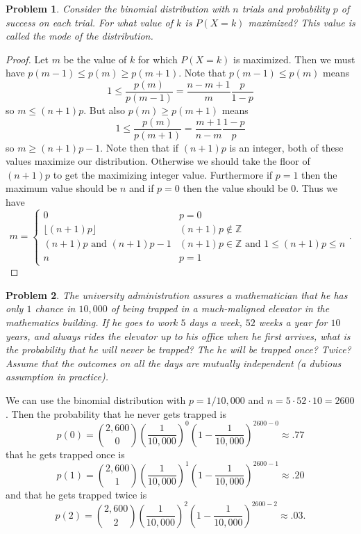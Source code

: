 \documentclass{article}
\newtheorem{problem}{Problem}
\begin{document}
\begin{problem}
\label{binom}
Consider the binomial distribution with $n$ trials and probability $p$ of success on each trial. For what value of $k$ is $P(X = k)$ maximized? This value is called the mode of the distribution.
\end{problem}
\begin{proof}
Let $m$ be the value of $k$ for which $P(X = k)$ is maximized. Then we must have $p(m-1) \leq p(m) \geq p(m+1)$. Note that $p(m-1) \leq p(m)$ means
\[
1 \leq \frac{p(m)}{p(m-1)} = \frac{n-m+1}{m} \frac{p}{1-p}
\]
so $m \leq (n+1)p$. But also $p(m) \geq p(m+1)$ means
\[
1 \leq \frac{p(m)}{p(m+1)} = \frac{m+1}{n-m} \frac{1-p}{p}
\]
so $m \geq (n+1)p - 1$. Note then that if $(n+1)p$ is an integer, both of these values maximize our distribution. Otherwise we should take the floor of $(n+1)p$ to get the maximizing integer value. Furthermore if $p = 1$ then the maximum value should be $n$ and if $p = 0$ then the value should be $0$. Thus we have
\[
m =
\begin{cases}
0 & p = 0\\
\lfloor (n+1)p \rfloor & (n+1)p \notin \mathbb{Z}\\
\text{$(n+1)p$ and $(n+1)p - 1$} & \text{$(n+1)p \in \mathbb{Z}$ and $1 \leq (n+1)p \leq n$}\\
n & p = 1
\end{cases}.
\]
\end{proof}

\begin{problem}
The university administration assures a mathematician that he has only $1$ chance in $10,000$ of being trapped in a much-maligned elevator in the mathematics building. If he goes to work $5$ days a week, $52$ weeks a year for $10$ years, and always rides the elevator up to his office when he first arrives, what is the probability that he will never be trapped? The he will be trapped once? Twice? Assume that the outcomes on all the days are mutually independent (a dubious assumption in practice).
\end{problem}

We can use the binomial distribution with $p = 1/10,000$ and $n = 5 \cdot 52 \cdot 10 = 2600$. Then the probability that he never gets trapped is
\[
p(0) = \binom{2,600}{0} \left (\frac{1}{10,000} \right )^0 \left ( 1 - \frac{1}{10,000} \right )^{2600-0} \approx .77
\]
that he gets trapped once is
\[
p(1) = \binom{2,600}{1} \left (\frac{1}{10,000} \right )^1 \left ( 1 - \frac{1}{10,000} \right )^{2600-1} \approx .20
\]
and that he gets trapped twice is
\[
p(2) = \binom{2,600}{2} \left (\frac{1}{10,000} \right )^2 \left ( 1 - \frac{1}{10,000} \right )^{2600-2} \approx .03.
\]
\end{document}
